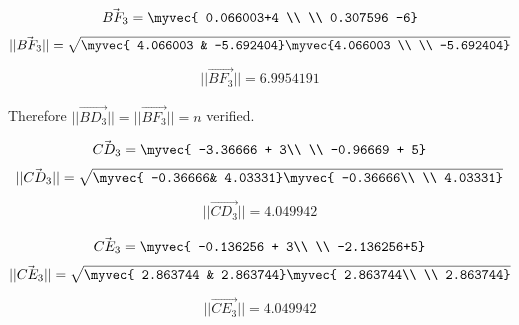 \documentclass[journal,12pt,twocolumn]{IEEEtran}
\theoremstyle{remark}
\begin{document}
\begin{align}
        \vec{BF_3}=\myvec{ 0.066003+4 \\ \\
         0.307596 -6}                              
\end{align}
\begin{align}
	||\vec{BF_3}||=\sqrt{\myvec{ 4.066003 &
       -5.692404}
       \myvec{4.066003 \\ \\
       -5.692404}} 
\end{align}
\begin{align}
        ||\vec{BF_3}||=6.9954191 
\end{align}           


\begin{flushleft}
        Therefore $||\vec{BD_3}||= ||\vec{BF_3}||=n $ verified.
\end{flushleft}





\begin{align}
        \vec{CD_3}=\myvec{ -3.36666 + 3\\ \\
       -0.96669 + 5}                              
\end{align}
\begin{align}
        ||\vec{CD_3}||=\sqrt{\myvec{ -0.36666&
       4.03331}
       \myvec{ -0.36666\\ \\
       4.03331}} 
\end{align}
\begin{align}
        ||\vec{CD_3}||=4.049942 
\end{align}           







\begin{align}
        \vec{CE_3}=\myvec{ -0.136256 + 3\\ \\
       -2.136256+5}                              
\end{align}
\begin{align}
        ||\vec{CE_3}||=\sqrt{\myvec{ 2.863744 &
       2.863744}
       \myvec{ 2.863744\\ \\
       2.863744}} 
\end{align}
\begin{align}
        ||\vec{CE_3}||= 4.049942 
\end{align}           
\end{document}
